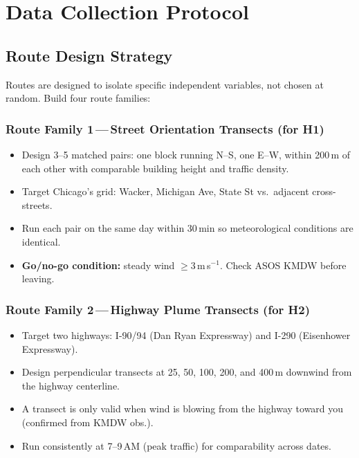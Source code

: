\documentclass[11pt, letterpaper]{article}
\begin{document}
\newpage

\section{Data Collection Protocol}

\subsection{Route Design Strategy}

Routes are designed to isolate specific independent variables, not chosen at random. Build four
route families:

\subsubsection{Route Family 1\,---\,Street Orientation Transects (for H1)}
\begin{itemize}
  \item Design 3--5 matched pairs: one block running N--S, one E--W, within 200\,m of each other with comparable building height and traffic density.
  \item Target Chicago's grid: Wacker, Michigan Ave, State St vs.\ adjacent cross-streets.
  \item Run each pair on the same day within 30\,min so meteorological conditions are identical.
  \item \textbf{Go/no-go condition:} steady wind $\geq 3$\,m\,s$^{-1}$. Check ASOS KMDW before leaving.
\end{itemize}

\subsubsection{Route Family 2\,---\,Highway Plume Transects (for H2)}
\begin{itemize}
  \item Target two highways: I-90/94 (Dan Ryan Expressway) and I-290 (Eisenhower Expressway).
  \item Design perpendicular transects at 25, 50, 100, 200, and 400\,m downwind from the highway centerline.
  \item A transect is only valid when wind is blowing from the highway toward you (confirmed from KMDW obs.).
  \item Run consistently at 7--9\,AM (peak traffic) for comparability across dates.
\end{itemize}
\end{document}
